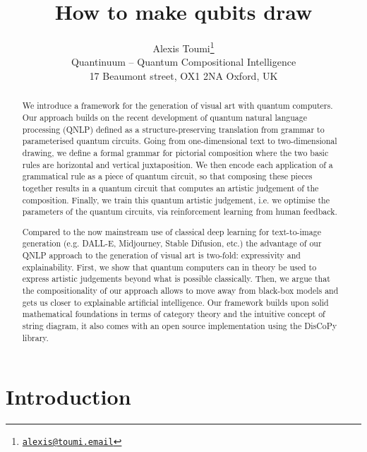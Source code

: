 

\title{How to make qubits draw}

\author{Alexis Toumi\thanks{\href{alexis@toumi.email}{\texttt{alexis@toumi.email}}}\\
Quantinuum – Quantum Compositional Intelligence\\
17 Beaumont street, OX1 2NA Oxford, UK}





\maketitle

\begin{abstract}
We introduce a framework for the generation of visual art with quantum computers.
Our approach builds on the recent development of quantum natural language processing (QNLP) defined as a structure-preserving translation from grammar to parameterised quantum circuits.
Going from one-dimensional text to two-dimensional drawing, we define a formal grammar for pictorial composition where the two basic rules are horizontal and vertical juxtaposition.
We then encode each application of a grammatical rule as a piece of quantum circuit, so that composing these pieces together results in a quantum circuit that computes an artistic judgement of the composition.
Finally, we train this quantum artistic judgement, i.e. we optimise the parameters of the quantum circuits, via reinforcement learning from human feedback.

Compared to the now mainstream use of classical deep learning for text-to-image generation (e.g. DALL-E, Midjourney, Stable Difusion, etc.) the advantage of our QNLP approach to the generation of visual art is two-fold: expressivity and explainability.
First, we show that quantum computers can in theory be used to express artistic judgements beyond what is possible classically.
Then, we argue that the compositionality of our approach allows to move away from black-box models and gets us closer to explainable artificial intelligence.
Our framework builds upon solid mathematical foundations in terms of category theory and the intuitive concept of string diagram, it also comes with an open source implementation using the DisCoPy library.
\end{abstract}

\section*{Introduction}


